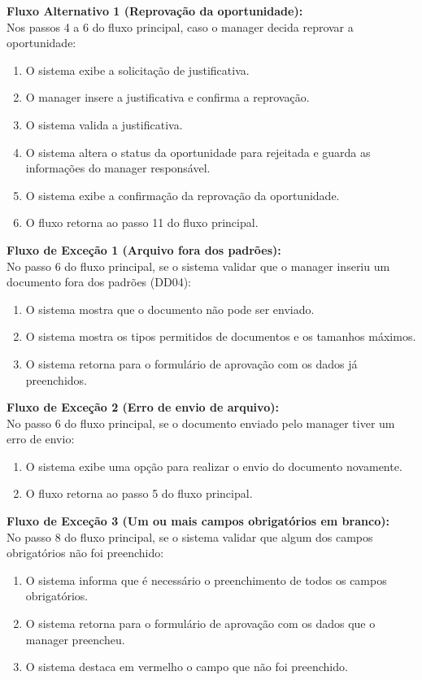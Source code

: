 \noindent\textbf{Fluxo Alternativo 1 (Reprovação da oportunidade):}\\
Nos passos 4 a 6 do fluxo principal, caso o manager decida reprovar a oportunidade:
\begin{enumerate}[noitemsep, topsep=-5pt, parsep=0pt]
    \item O sistema exibe a solicitação de justificativa.
    \item O manager insere a justificativa e confirma a reprovação.
    \item O sistema valida a justificativa.
    \item O sistema altera o status da oportunidade para rejeitada e guarda as informações do manager responsável.
    \item O sistema exibe a confirmação da reprovação da oportunidade.
    \item O fluxo retorna ao passo 11 do fluxo principal.
\end{enumerate}

\noindent\textbf{Fluxo de Exceção 1 (Arquivo fora dos padrões):}\\
No passo 6 do fluxo principal, se o sistema validar que o manager inseriu um documento fora dos padrões (DD04):
\begin{enumerate}[noitemsep, topsep=-5pt, parsep=0pt]
    \item O sistema mostra que o documento não pode ser enviado.
    \item O sistema mostra os tipos permitidos de documentos e os tamanhos máximos.
    \item O sistema retorna para o formulário de aprovação com os dados já preenchidos.
\end{enumerate}

\noindent\textbf{Fluxo de Exceção 2 (Erro de envio de arquivo):}\\
No passo 6 do fluxo principal, se o documento enviado pelo manager tiver um erro de envio:
\begin{enumerate}[noitemsep, topsep=-5pt, parsep=0pt]
    \item O sistema exibe uma opção para realizar o envio do documento novamente.
    \item O fluxo retorna ao passo 5 do fluxo principal.
\end{enumerate}

\noindent\textbf{Fluxo de Exceção 3 (Um ou mais campos obrigatórios em branco):}\\
No passo 8 do fluxo principal, se o sistema validar que algum dos campos obrigatórios não foi preenchido:
\begin{enumerate}[noitemsep, topsep=-5pt, parsep=0pt]
    \item O sistema informa que é necessário o preenchimento de todos os campos obrigatórios.
    \item O sistema retorna para o formulário de aprovação com os dados que o manager preencheu.
    \item O sistema destaca em vermelho o campo que não foi preenchido.
\end{enumerate}

